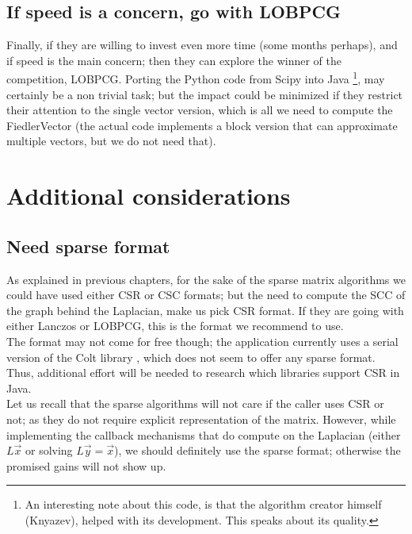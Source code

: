 \subsection{If speed is a concern, go with \gls{LOBPCG}}

Finally, if they are willing to invest even more time (some months
perhaps),  and if speed is the
main concern; then they can explore the winner of the competition,
\gls{LOBPCG}. Porting the Python code from Scipy into Java \footnote{An
  interesting note about this code, is that the algorithm creator
  himself (Knyazev), helped with its development. This speaks about
  its quality.}, may certainly be a non trivial task; but the impact
could be minimized if they restrict their attention to the single
vector version, which is all we need to compute the \gls{FiedlerVector} (the
actual code implements a block version that can approximate multiple
vectors, but we do not need that).

\section{Additional considerations}

\subsection{Need sparse format}

As explained in previous chapters, for the sake of the sparse matrix
algorithms we 
could have used either CSR or CSC formats; but the need to compute the
\gls{SCC} of the graph behind the \gls{Laplacian}, make us pick CSR
format. If they are going with either Lanczos or \gls{LOBPCG}, this is the
format we recommend to use. \\

The format may not come for free though; the application currently
uses a serial version of the Colt library \cite{colt}, which does not
seem to offer any sparse format. Thus, additional effort will be
needed to research which libraries support CSR in Java. \\

Let us recall that the sparse algorithms will not care if the caller uses
CSR or not; as they do not require explicit representation of the
matrix. However, while implementing the callback mechanisms that do
compute on the \gls{Laplacian} (either $L\vec{x}$ or solving $L\vec{y} =
\vec{x}$), we should definitely use the sparse format; otherwise the
promised gains will not show up.

